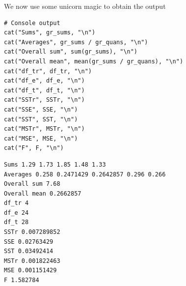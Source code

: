 \documentclass[a4paper]{article}
\numberwithin{equation}{section}
\begin{document}
We now use some unicorn magic to obtain the output
\begin{mdframed}[leftline=false,rightline=false,backgroundcolor=magenta!10,nobreak=true]
  \begin{verbatim}
# Console output
cat("Sums", gr_sums, "\n")
cat("Averages", gr_sums / gr_quans, "\n")
cat("Overall sum", sum(gr_sums), "\n")
cat("Overall mean", mean(gr_sums / gr_quans), "\n")
cat("df_tr", df_tr, "\n")
cat("df_e", df_e, "\n")
cat("df_t", df_t, "\n")
cat("SSTr", SSTr, "\n")
cat("SSE", SSE, "\n")
cat("SST", SST, "\n")
cat("MSTr", MSTr, "\n")
cat("MSE", MSE, "\n")
cat("F", F, "\n")
  \end{verbatim}
\end{mdframed}

\begin{mdframed}[leftline=false,rightline=false,backgroundcolor=teal!10,nobreak=true]
  \begin{verbatim}
Sums 1.29 1.73 1.85 1.48 1.33
Averages 0.258 0.2471429 0.2642857 0.296 0.266
Overall sum 7.68
Overall mean 0.2662857
df_tr 4
df_e 24
df_t 28
SSTr 0.007289852
SSE 0.02763429
SST 0.03492414
MSTr 0.001822463
MSE 0.001151429
F 1.582784
  \end{verbatim}
\end{mdframed}
\end{document}
